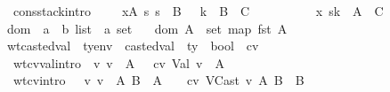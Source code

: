\begin{isabellebody}
\ \ cons{\isacharunderscore}stack{\isacharbrackleft}intro{\isacharbang}{\isacharbrackright}{\isacharcolon}\ {\isachardoublequoteopen}{\isasymlbrakk}\ {\isasymGamma}{\isacharsemicolon}{\isasymSigma}\ {\isasymturnstile}\ {\isasymrho}{\isacharsemicolon}\ {\isacharparenleft}x{\isacharcomma}A{\isacharparenright}{\isacharhash}{\isasymGamma}\ {\isasymturnstile}\isactrlisub s\ s\ {\isacharcolon}\ B{\isacharsemicolon}\ {\isasymSigma}\ {\isasymturnstile}\ k\ {\isacharcolon}\ B\ {\isasymRightarrow}\ C\ {\isasymrbrakk}\ {\isasymLongrightarrow}\isanewline
\ \ \ \ \ \ {\isasymSigma}\ {\isasymturnstile}\ {\isacharparenleft}x{\isacharcomma}\ s{\isacharcomma}{\isasymrho}{\isacharparenright}{\isacharhash}k\ {\isacharcolon}\ A\ {\isasymRightarrow}\ C{\isachardoublequoteclose}\isanewline
\isanewline
{}\isamarkupfalse \ dom\ {\isacharcolon}{\isacharcolon}\ {\isachardoublequoteopen}{\isacharparenleft}{\isacharprime}a\ {\isasymtimes}\ {\isacharprime}b{\isacharparenright}\ list\ {\isasymRightarrow}\ {\isacharprime}a\ set{\isachardoublequoteclose}\ \isanewline
\ \ {\isachardoublequoteopen}dom\ A\ {\isasymequiv}\ set\ {\isacharparenleft}map\ fst\ A{\isacharparenright}{\isachardoublequoteclose}\isanewline
\isanewline
{}\isamarkupfalse \ wt{\isacharunderscore}casted{\isacharunderscore}val\ {\isacharcolon}{\isacharcolon}\ {\isachardoublequoteopen}ty{\isacharunderscore}env\ {\isasymRightarrow}\ casted{\isacharunderscore}val\ {\isasymRightarrow}\ ty\ {\isasymRightarrow}\ bool{\isachardoublequoteclose}\ {\isacharparenleft}{\isachardoublequoteopen}{\isacharunderscore}\ {\isasymturnstile}cv\ {\isacharunderscore}\ {\isacharcolon}\ {\isacharunderscore}{\isachardoublequoteclose}\ {\isacharbrackleft}{}{}{\isacharcomma}{}{}{\isacharcomma}{}{}{\isacharbrackright}\ {}{}{\isacharparenright}\ \isanewline
\ \ wt{\isacharunderscore}cv{\isacharunderscore}val{\isacharbrackleft}intro{\isacharbang}{\isacharbrackright}{\isacharcolon}\ {\isachardoublequoteopen}{\isasymSigma}\ {\isasymturnstile}v\ v\ {\isacharcolon}\ A\ {\isasymLongrightarrow}\ {\isasymSigma}\ {\isasymturnstile}cv\ Val\ v\ {\isacharcolon}\ A{\isachardoublequoteclose}\ {\isacharbar}\isanewline
\ \ wt{\isacharunderscore}cv{\isacharbrackleft}intro{\isacharbang}{\isacharbrackright}{\isacharcolon}\ {\isachardoublequoteopen}{\isasymlbrakk}\ {\isasymSigma}\ {\isasymturnstile}v\ v\ {\isacharcolon}\ A{\isacharsemicolon}\ B\ {\isasymsqsubseteq}\ A\ {\isasymrbrakk}\ {\isasymLongrightarrow}\ {\isasymSigma}\ {\isasymturnstile}cv\ VCast\ v\ A\ B\ {\isacharcolon}\ B{\isachardoublequoteclose}\isanewline

\end{isabellebody}
